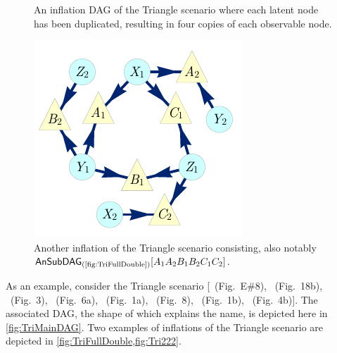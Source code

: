 {\begin{figure}[t]
\begin{minipage}[t]{0.38\linewidth}
\caption{An inflation DAG of the Triangle scenario where each latent node has been duplicated, resulting in four copies of each observable node.}\label{fig:TriFullDouble}
\end{minipage}
\hfill
\begin{minipage}[b]{0.35\linewidth}
\centering
\includegraphics[scale=1]{TriDagSub222.pdf}
\caption{Another inflation of the Triangle scenario consisting, also notably $\ansubgraph[(\textrm{\cref{fig:TriFullDouble}})]{A_1 A_2 B_1 B_2 C_1 C_2}$.}\label{fig:Tri222}
\end{minipage}
\end{figure}



As an example, consider the Triangle scenario [\citealp{pusey2014gdag}~(Fig.~E\#8), \citealp{WoodSpekkens}~(Fig.~18b), \citealp{fritz2012bell}~(Fig.~3), \citealp{chaves2014novel}~(Fig.~6a), \citealp{Chaves2015infoquantum}~(Fig.~1a), \citealp{BilocalCorrelations}~(Fig.~8), \citealp{steudel2010ancestors}~(Fig.~1b), \citealp{chaves2014informationinference}~(Fig.~4b)]. The associated DAG, the shape of which explains the name, is depicted here in \cref{fig:TriMainDAG}. 
Two examples of inflations of the Triangle scenario are depicted in \cref{fig:TriFullDouble,fig:Tri222}.

}
